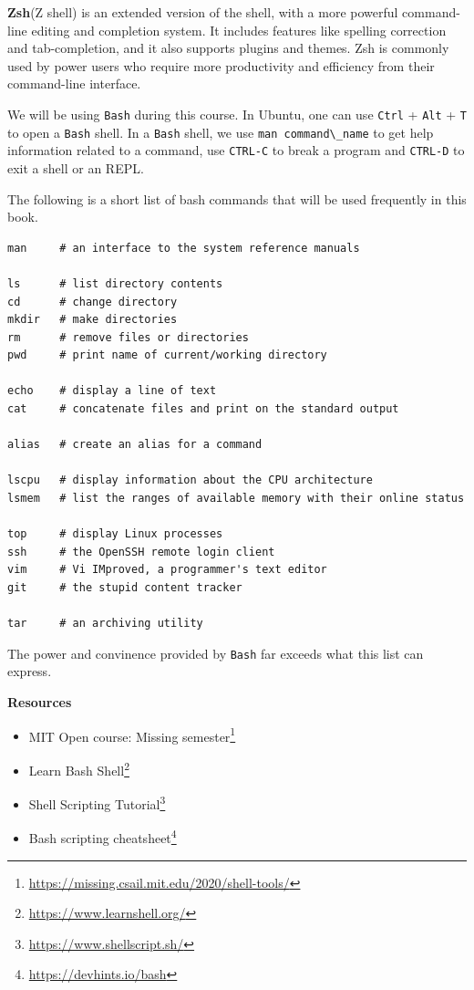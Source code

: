 \documentclass[
  notoc %
]{tufte-book}
\DeclareRobustCommand{\href}[2]{#2\footnote{\url{#1}}}
\providecommand{\tightlist}{%
  \setlength{\itemsep}{0pt}\setlength{\parskip}{0pt}
}
\newcommand{\passthrough}[1]{#1}
\begin{document}
\textbf{Zsh}(Z shell) is an extended version of the shell, with a more
powerful command-line editing and completion system. It includes
features like spelling correction and tab-completion, and it also
supports plugins and themes. Zsh is commonly used by power users who
require more productivity and efficiency from their command-line
interface.

We will be using \passthrough{\lstinline!Bash!} during this course. In
Ubuntu, one can use \passthrough{\lstinline!Ctrl!} +
\passthrough{\lstinline!Alt!} + \passthrough{\lstinline!T!} to open a
\passthrough{\lstinline!Bash!} shell. In a
\passthrough{\lstinline!Bash!} shell, we use
\passthrough{\lstinline!man command\_name!} to get help information
related to a command, use \passthrough{\lstinline!CTRL-C!} to break a
program and \passthrough{\lstinline!CTRL-D!} to exit a shell or an REPL.

The following is a short list of bash commands that will be used
frequently in this book.

\begin{lstlisting}
man     # an interface to the system reference manuals

ls      # list directory contents
cd      # change directory
mkdir   # make directories
rm      # remove files or directories
pwd     # print name of current/working directory

echo    # display a line of text
cat     # concatenate files and print on the standard output

alias   # create an alias for a command

lscpu   # display information about the CPU architecture
lsmem   # list the ranges of available memory with their online status

top     # display Linux processes
ssh     # the OpenSSH remote login client
vim     # Vi IMproved, a programmer's text editor
git     # the stupid content tracker

tar     # an archiving utility
\end{lstlisting}

The power and convinence provided by \passthrough{\lstinline!Bash!} far
exceeds what this list can express.

\textbf{Resources}

\begin{itemize}
\tightlist
\item
  \href{https://missing.csail.mit.edu/2020/shell-tools/}{MIT Open
  course: Missing semester}
\item
  \href{https://www.learnshell.org/}{Learn Bash Shell}
\item
  \href{https://www.shellscript.sh/}{Shell Scripting Tutorial}
\item
  \href{https://devhints.io/bash}{Bash scripting cheatsheet}
\end{itemize}
\end{document}
